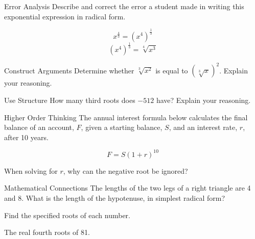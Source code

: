 \documentclass{article}
\newenvironment{practice}[2]{}{}        %
\newcommand{\answer}[1]{}               %
\begin{document}
\begin{practice}{20}{2}
Error Analysis Describe and correct the error a student made in writing this exponential expression in radical form.

\[
x^{\frac43}=(x^4)^{\frac13}
\]
\[
(x^4)^{\frac13}=\sqrt[4]{x^3}
\]

\answer{\((x^4)^{\frac13}\) is correct, but the denominator of the fraction, 3, is the index of the radical: \(\sqrt[3]{x^4}\).}
\end{practice}

\begin{practice}{21}{2}
Construct Arguments Determine whether \(\sqrt[3]{x^2}\) is equal to \((\sqrt[3]{x})^2\). Explain your reasoning.

\answer{Yes, they are equal; \(\sqrt[3]{x^2}\) and \((\sqrt[3]{x})^2\) can both be written as \(x^{\frac23}\), so they must be equal.}
\end{practice}

\begin{practice}{22}{2}
Use Structure How many third roots does \(-512\) have? Explain your reasoning.

\answer{1; only one real number, \(-8\), times itself 3 times equals \(-512\).}
\end{practice}

\begin{practice}{23}{2}
Higher Order Thinking The annual interest formula below calculates the final balance of an account, \(F\), given a starting balance, \(S\), and an interest rate, \(r\), after 10 years.

\[
F=S(1+r)^{10}
\]

When solving for \(r\), why can the negative root be ignored?

\answer{The negative root can be ignored because the interest rate must be a positive number.}
\end{practice}

\begin{practice}{24}{2}
Mathematical Connections The lengths of the two legs of a right triangle are 4 and 8. What is the length of the hypotenuse, in simplest radical form?

\answer{\(4\sqrt{5}\)}
\end{practice}

\begin{practice}{25}{1}
Find the specified roots of each number.

The real fourth roots of 81.

\answer{\(\pm3\)}
\end{practice}
\end{document}
